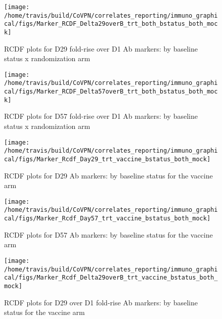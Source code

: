 \documentclass[]{book}
\theoremstyle{definition}
\theoremstyle{definition}
\theoremstyle{definition}
\newcommand{\1}{\mathbbm{1}}
\begin{document}
\begin{figure}[H]

{\centering \texttt{[image: /home/travis/build/CoVPN/correlates\_reporting/immuno\_graphical/figs/Marker\_RCDF\_Delta29overB\_trt\_both\_bstatus\_both\_mock]} 

}

\caption{RCDF plots for D29 fold-rise over D1 Ab markers: by baseline status x randomization arm}\label{fig:unnamed-chunk-23}
\end{figure}

\begin{figure}[H]

{\centering \texttt{[image: /home/travis/build/CoVPN/correlates\_reporting/immuno\_graphical/figs/Marker\_RCDF\_Delta57overB\_trt\_both\_bstatus\_both\_mock]} 

}

\caption{RCDF plots for D57 fold-rise over D1 Ab markers: by baseline status x randomization arm}\label{fig:unnamed-chunk-24}
\end{figure}

\begin{figure}[H]

{\centering \texttt{[image: /home/travis/build/CoVPN/correlates\_reporting/immuno\_graphical/figs/Marker\_Rcdf\_Day29\_trt\_vaccine\_bstatus\_both\_mock]} 

}

\caption{RCDF plots for D29 Ab markers: by baseline status for the vaccine arm}\label{fig:unnamed-chunk-25}
\end{figure}

\begin{figure}[H]

{\centering \texttt{[image: /home/travis/build/CoVPN/correlates\_reporting/immuno\_graphical/figs/Marker\_Rcdf\_Day57\_trt\_vaccine\_bstatus\_both\_mock]} 

}

\caption{RCDF plots for D57 Ab markers: by baseline status for the vaccine arm}\label{fig:unnamed-chunk-26}
\end{figure}

\begin{figure}[H]

{\centering \texttt{[image: /home/travis/build/CoVPN/correlates\_reporting/immuno\_graphical/figs/Marker\_Rcdf\_Delta29overB\_trt\_vaccine\_bstatus\_both\_mock]} 

}

\caption{RCDF plots for D29 over D1 fold-rise Ab markers: by baseline status for the vaccine arm}\label{fig:unnamed-chunk-27}
\end{figure}
\end{document}
